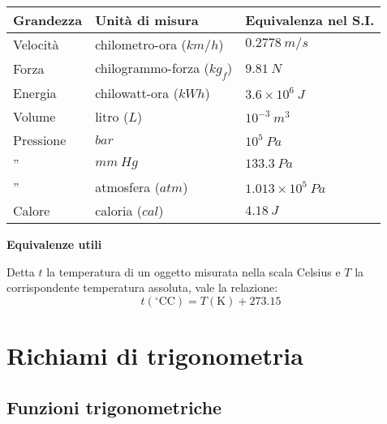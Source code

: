 \documentclass[10pt,a4paper]{book}
\renewcommand{\degree}{^\circ\text{C}} %
\begin{document}
\begin{table}[!h]
	\centering
	\begin{tabular}{l|l|l}
		\hline
		\textbf{Grandezza} & \textbf{Unità di misura} & \textbf{Equivalenza nel S.I.} \\
		\hline
		Velocità & chilometro-ora ($\displaystyle km/h$) & $\displaystyle 0.2778\ m/s$ \\
		Forza & chilogrammo-forza ($\displaystyle kg_f$) & $\displaystyle 9.81\ N$ \\
		Energia & chilowatt-ora ($\displaystyle kWh$) & $\displaystyle 3.6\times 10^6 \ J$ \\
		Volume & litro ($\displaystyle L$) & $\displaystyle 10^{-3} \ m^3$ \\
		Pressione & $\displaystyle bar$ & $\displaystyle 10^5 \ Pa$ \\
		'' & $\displaystyle mm\ Hg$ & $\displaystyle 133.3\ Pa$ \\
		'' & atmosfera ($\displaystyle atm$) & $\displaystyle 1.013\times 10^5 \ Pa$ \\
		Calore & caloria ($\displaystyle cal$) & $\displaystyle 4.18\ J$ \\
	\end{tabular}
\end{table}

\begin{center}
	\textbf{Equivalenze utili}
\end{center}

Detta $\displaystyle t$ la temperatura di un oggetto misurata nella scala Celsius e $\displaystyle T$ la corrispondente temperatura assoluta, vale la relazione:
\begin{equation*}
	t( \degree \text{C}) =T(\text{K}) +273.15
\end{equation*}















\chapter{Richiami di trigonometria}

\section*{Funzioni trigonometriche}
\end{document}
